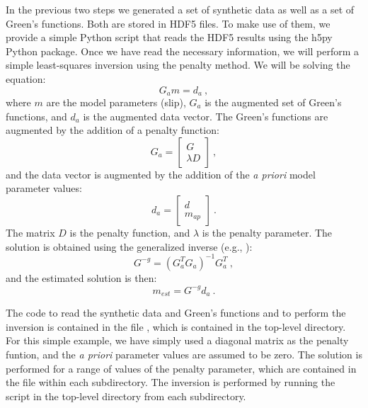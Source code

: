 In the previous two steps we generated a set of synthetic data as
well as a set of Green's functions. Both are stored in HDF5 files.
To make use of them, we provide a simple Python script that reads
the HDF5 results using the h5py Python package. Once we have read
the necessary information, we will perform a simple least-squares
inversion using the penalty method. We will be solving the equation:
\begin{equation}
G_{a}m=d_{a}\:,
\end{equation}
where $m$ are the model parameters (slip), $G_{a}$ is the augmented
set of Green's functions, and $d_{a}$ is the augmented data vector.
The Green's functions are augmented by the addition of a penalty function:
\begin{equation}
G_{a}=\left[\begin{array}{c}
G\\
\lambda D
\end{array}\right]\:,
\end{equation}
and the data vector is augmented by the addition of the \textit{a
priori} model parameter values:
\begin{equation}
d_{a}=\left[\begin{array}{c}
d\\
m_{ap}
\end{array}\right]\:.
\end{equation}
The matrix $D$ is the penalty function, and $\lambda$ is the penalty
parameter. The solution is obtained using the generalized inverse
(e.g., \cite{Menke:1984}):
\begin{equation}
G^{-g}=\left(G_{a}^{T}G_{a}\right)^{-1}G_{a}^{T}\:,
\end{equation}
and the estimated solution is then:
\begin{equation}
m_{est}=G^{-g}d_{a}\:.
\end{equation}


The code to read the synthetic data and Green's functions and to perform
the inversion is contained in the file , which
is contained in the top-level directory. For this simple example,
we have simply used a diagonal matrix as the penalty funtion, and
the \textit{a priori} parameter values are assumed to be zero. The
solution is performed for a range of values of the penalty parameter,
which are contained in the file  within
each subdirectory. The inversion is performed by running the script
in the top-level directory from each subdirectory. 

